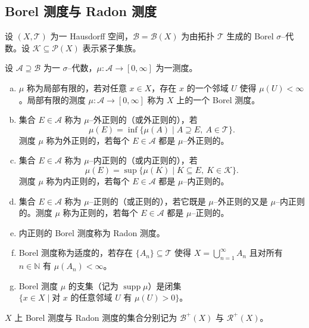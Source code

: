 \documentclass[../../main.tex]{subfiles}%
\begin{document}
\subsection{Borel 测度与 Radon 测度}\label{subsection:ch01-Borel测度}

设 $(X,\mathcal{T})$ 为一 Hausdorff 空间，$\mathcal{B}=\mathcal{B}(X)$ 为由拓扑 $\mathcal{T}$ 生成的 Borel $\sigma$--代数。设 $\mathcal{K}\subseteq\mathcal{P}(X)$ 表示紧子集族。

\begin{definition}\label{definition:ch01-Borel测度}
\label{remark:ch01-局部有限}
设 $\mathcal{A}\supseteq\mathcal{B}$ 为一 $\sigma$--代数，$\mu:\mathcal{A}\to[0,\infty]$ 为一测度。
\begin{enumerate}[(a)]
\item $\mu$ 称为局部有限的，若对任意 $x\in X$，存在 $x$ 的一个邻域 $U$ 使得 $\mu(U)<\infty$。局部有限的测度 $\mu:\mathcal{A}\to[0,\infty]$ 称为 $X$ 上的一个 Borel 测度。
\item 集合 $E\in\mathcal{A}$ 称为 $\mu$--外正则的（或外正则的），若
\[
\mu(E)=\inf\{\mu(A)\mid A\supseteq E,\ A\in\mathcal{T}\}.
\]
测度 $\mu$ 称为外正则的，若每个 $E\in\mathcal{A}$ 都是 $\mu$--外正则的。
\item 集合 $E\in\mathcal{A}$ 称为 $\mu$--内正则的（或内正则的），若
\[
\mu(E)=\sup\{\mu(K)\mid K\subseteq E,\ K\in\mathcal{K}\}.
\]
测度 $\mu$ 称为内正则的，若每个 $E\in\mathcal{A}$ 都是 $\mu$--内正则的。
\item 集合 $E\in\mathcal{A}$ 称为 $\mu$--正则的（或正则的），若它既是 $\mu$--外正则的又是 $\mu$--内正则的。测度 $\mu$ 称为正则的，若每个 $E\in\mathcal{A}$ 都是 $\mu$--正则的。
\item 内正则的 Borel 测度称为 Radon 测度。
\item Borel 测度称为适度的，若存在 $\{A_n\}\subseteq\mathcal{T}$ 使得 $X=\bigcup_{n=1}^\infty A_n$ 且对所有 $n\in\mathbb{N}$ 有 $\mu(A_n)<\infty$。
\item Borel 测度 $\mu$ 的支集（记为 $\operatorname{supp}\mu$）是闭集 $\{x\in X\mid\text{对 }x\text{ 的任意邻域 }U\text{ 有 }\mu(U)>0\}$。
\end{enumerate}
$X$ 上 Borel 测度与 Radon 测度的集合分别记为 $\mathcal{B}^+(X)$ 与 $\mathcal{R}^+(X)$。
\end{definition}
\end{document}
